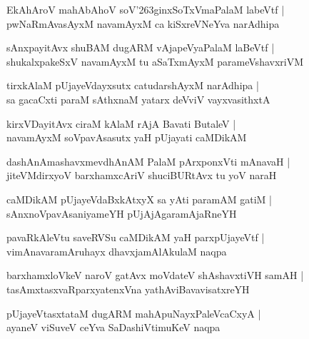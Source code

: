 \documentclass[twoside,12pt,openright]{book}
\def\S{\char'263}
\newcounter{shloka}[chapter]
\begin{document}
\begin{shloka}%
EkAhAroV mahAbAhoV soV\S ginxSoTxVmaPalaM labeVtf |\\
pwNaRmAvasAyxM navamAyxM ca kiSxreVNeYva narAdhipa
\end{shloka}

\begin{shloka}%
sAnxpayitAvx shuBAM dugARM vAjapeVyaPalaM laBeVtf |\\
shukalxpakeSxV navamAyxM tu aSaTxmAyxM parameVshavxriVM 
\end{shloka}

\begin{shloka}%
tirxkAlaM pUjayeVdayxsutx catudarshAyxM narAdhipa |\\
sa gacaCxti paraM sAthxnaM yatarx deVviV vayxvasithxtA 
\end{shloka}

\begin{shloka}%
kirxVDayitAvx ciraM kAlaM  rAjA Bavati ButaleV |\\
navamAyxM soVpavAsasutx yaH pUjayati caMDikAM
\end{shloka}

\begin{shloka}%
dashAnAmashavxmevdhAnAM PalaM pArxponxVti mAnavaH |\\
jiteVMdirxyoV barxhamxcAriV shuciBURtAvx tu yoV naraH 
\end{shloka}

\begin{shloka}%
caMDikAM pUjayeVdaBxkAtxyX sa yAti paramAM gatiM |\\
sAnxnoVpavAsaniyameYH pUjAjAgaramAjaRneYH
\end{shloka}

\begin{shloka}%
pavaRkAleVtu saveRVSu caMDikAM yaH parxpUjayeVtf |\\
vimAnavaramAruhayx dhavxjamAlAkulaM naqpa
\end{shloka}

\begin{shloka}%
barxhamxloVkeV naroV gatAvx moVdateV shAshavxtiVH samAH |\\
tasAmxtasxvaRparxyatenxVna yathAviBavavisatxreYH
\end{shloka}

\begin{shloka}%
pUjayeVtasxtataM dugARM mahApuNayxPaleVcaCxyA |\\
ayaneV viSuveV ceYva SaDashiVtimuKeV naqpa
\end{shloka}
\end{document}
